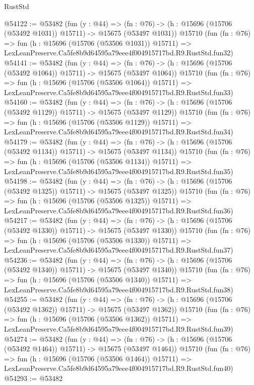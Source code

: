 \begin{lexlean}{RustStd}
\begin{coremodule}
@54122 := @53482
    (fun (y : @44) =>
    (fn : @76) -> (h : @15696 (@15706 (@53492 @1031)) @15711) -> @15675 (@53497 @1031))
    @15710
    (fun (fn : @76) =>
    fun (h : @15696 (@15706 (@53506 @1031)) @15711) =>
    LexLeanPreserve.Ca5fe8b9d64595a79eee4f004915717bd.R9.RustStd.fun32)
@54141 := @53482
    (fun (y : @44) =>
    (fn : @76) -> (h : @15696 (@15706 (@53492 @1064)) @15711) -> @15675 (@53497 @1064))
    @15710
    (fun (fn : @76) =>
    fun (h : @15696 (@15706 (@53506 @1064)) @15711) =>
    LexLeanPreserve.Ca5fe8b9d64595a79eee4f004915717bd.R9.RustStd.fun33)
@54160 := @53482
    (fun (y : @44) =>
    (fn : @76) -> (h : @15696 (@15706 (@53492 @1129)) @15711) -> @15675 (@53497 @1129))
    @15710
    (fun (fn : @76) =>
    fun (h : @15696 (@15706 (@53506 @1129)) @15711) =>
    LexLeanPreserve.Ca5fe8b9d64595a79eee4f004915717bd.R9.RustStd.fun34)
@54179 := @53482
    (fun (y : @44) =>
    (fn : @76) -> (h : @15696 (@15706 (@53492 @1134)) @15711) -> @15675 (@53497 @1134))
    @15710
    (fun (fn : @76) =>
    fun (h : @15696 (@15706 (@53506 @1134)) @15711) =>
    LexLeanPreserve.Ca5fe8b9d64595a79eee4f004915717bd.R9.RustStd.fun35)
@54198 := @53482
    (fun (y : @44) =>
    (fn : @76) -> (h : @15696 (@15706 (@53492 @1325)) @15711) -> @15675 (@53497 @1325))
    @15710
    (fun (fn : @76) =>
    fun (h : @15696 (@15706 (@53506 @1325)) @15711) =>
    LexLeanPreserve.Ca5fe8b9d64595a79eee4f004915717bd.R9.RustStd.fun36)
@54217 := @53482
    (fun (y : @44) =>
    (fn : @76) -> (h : @15696 (@15706 (@53492 @1330)) @15711) -> @15675 (@53497 @1330))
    @15710
    (fun (fn : @76) =>
    fun (h : @15696 (@15706 (@53506 @1330)) @15711) =>
    LexLeanPreserve.Ca5fe8b9d64595a79eee4f004915717bd.R9.RustStd.fun37)
@54236 := @53482
    (fun (y : @44) =>
    (fn : @76) -> (h : @15696 (@15706 (@53492 @1340)) @15711) -> @15675 (@53497 @1340))
    @15710
    (fun (fn : @76) =>
    fun (h : @15696 (@15706 (@53506 @1340)) @15711) =>
    LexLeanPreserve.Ca5fe8b9d64595a79eee4f004915717bd.R9.RustStd.fun38)
@54255 := @53482
    (fun (y : @44) =>
    (fn : @76) -> (h : @15696 (@15706 (@53492 @1362)) @15711) -> @15675 (@53497 @1362))
    @15710
    (fun (fn : @76) =>
    fun (h : @15696 (@15706 (@53506 @1362)) @15711) =>
    LexLeanPreserve.Ca5fe8b9d64595a79eee4f004915717bd.R9.RustStd.fun39)
@54274 := @53482
    (fun (y : @44) =>
    (fn : @76) -> (h : @15696 (@15706 (@53492 @1464)) @15711) -> @15675 (@53497 @1464))
    @15710
    (fun (fn : @76) =>
    fun (h : @15696 (@15706 (@53506 @1464)) @15711) =>
    LexLeanPreserve.Ca5fe8b9d64595a79eee4f004915717bd.R9.RustStd.fun40)
@54293 := @53482

\end{coremodule}
\end{lexlean}
